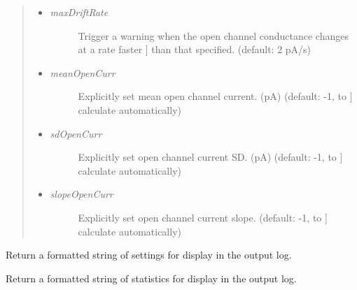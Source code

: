 \documentclass[letterpaper,10pt,english]{sphinxmanual}
\begin{document}
\begin{fulllineitems}
\begin{quote}
\begin{description}
\begin{itemize}
\begin{description}
\end{description}

\item {} \begin{description}
\item[{\emph{maxDriftRate}}] \leavevmode{[}Trigger a warning when the open channel conductance changes at a rate faster {]}
than that specified. (default: 2 pA/s)

\end{description}

\item {} \begin{description}
\item[{\emph{meanOpenCurr}}] \leavevmode{[}Explicitly set mean open channel current. (pA) (default: -1, to {]}
calculate automatically)

\end{description}

\item {} \begin{description}
\item[{\emph{sdOpenCurr}}] \leavevmode{[}Explicitly set open channel current SD. (pA) (default: -1, to {]}
calculate automatically)

\end{description}

\item {} \begin{description}
\item[{\emph{slopeOpenCurr}}] \leavevmode{[}Explicitly set open channel current slope. (default: -1, to {]}
calculate automatically)

\end{description}

\end{itemize}

\end{description}\end{quote}

\begin{fulllineitems}
\label{api-doc/mosaic.partition:mosaic.eventSegment.eventSegment.formatsettings}
Return a formatted string of settings for display in the output log.

\end{fulllineitems}


\begin{fulllineitems}
\label{api-doc/mosaic.partition:mosaic.eventSegment.eventSegment.formatstats}
Return a formatted string of statistics for display in the output log.

\end{fulllineitems}


\end{fulllineitems}
\end{document}
